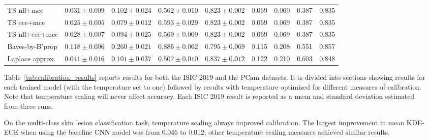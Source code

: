 \begin{table}[h!]
{\begin{tabular}{l|cccc|m{0.8cm}m{0.8cm}m{0.8cm}m{0.8cm}|}
			TS nll+mce & \multicolumn{1}{c|}{$0.031 \pm 0.009$}& \multicolumn{1}{c|}{$0.102 \pm 0.024$}& \multicolumn{1}{c|}{$0.562 \pm 0.010$}& \multicolumn{1}{c|}{$0.823 \pm 0.002$}& \multicolumn{1}{c|}{0.069} & \multicolumn{1}{c|}{0.069} & \multicolumn{1}{c|}{0.387} & \multicolumn{1}{c|}{0.835} \\
			TS ece+mce & \multicolumn{1}{c|}{$0.025 \pm 0.005$}& \multicolumn{1}{c|}{$0.079 \pm 0.012$}& \multicolumn{1}{c|}{$0.593 \pm 0.029$}& \multicolumn{1}{c|}{$0.823 \pm 0.002$}& \multicolumn{1}{c|}{0.069} & \multicolumn{1}{c|}{0.069} & \multicolumn{1}{c|}{0.387} & \multicolumn{1}{c|}{0.835} \\
			TS nll+ece+mce & \multicolumn{1}{c|}{$0.028 \pm 0.007$}& \multicolumn{1}{c|}{$0.094 \pm 0.025$}& \multicolumn{1}{c|}{$0.569 \pm 0.009$}& \multicolumn{1}{c|}{$0.823 \pm 0.002$}& \multicolumn{1}{c|}{0.069} & \multicolumn{1}{c|}{0.069} & \multicolumn{1}{c|}{0.387} & \multicolumn{1}{c|}{0.835} \\ \hline \hline
			Bayes-by-B'prop & \multicolumn{1}{c|}{$0.118 \pm 0.006$}& \multicolumn{1}{c|}{$0.260 \pm 0.021$}& \multicolumn{1}{c|}{$0.886 \pm 0.062$}& \multicolumn{1}{c|}{$0.795 \pm 0.069$}& \multicolumn{1}{c|}{0.115} & \multicolumn{1}{c|}{0.208} & \multicolumn{1}{c|}{0.551} & \multicolumn{1}{c|}{0.857} \\ 
			Laplace approx.& \multicolumn{1}{c|}{$0.041 \pm 0.016$}& \multicolumn{1}{c|}{$0.101 \pm 0.037$}& \multicolumn{1}{c|}{$0.507 \pm 0.010$}& \multicolumn{1}{c|}{$0.837 \pm 0.012$}& \multicolumn{1}{c|}{0.122} & \multicolumn{1}{c|}{0.210} & \multicolumn{1}{c|}{0.603} & \multicolumn{1}{c|}{0.848} \\\hline
		\end{tabular}%
	}
\end{table}

Table~\ref{tab:calibration_results} reports results for both the ISIC 2019 and the PCam datasets. It is divided into sections showing results for each trained model (with the temperature set to one) followed by results with temperature optimized for different measures of calibration. Note that temperature scaling will never affect accuracy. Each ISIC 2019 result is reported as a mean and standard deviation estimated from three runs.

On the multi-class skin lesion classification task, temperature scaling always improved calibration. The largest improvement in mean KDE-ECE when using the baseline CNN model was from 0.046 to 0.012; other temperature scaling measures achieved similar results. 

